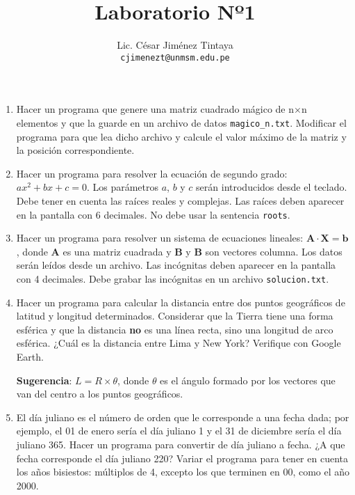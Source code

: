 \documentclass[a4paper,11pt,twoside,final]{article}
\begin{document}
    \title{Laboratorio Nº1}
    \author{Lic. César Jiménez Tintaya\\ \small{\texttt{cjimenezt@unmsm.edu.pe}}}
    \date{}
    \maketitle

    \begin{enumerate}
        \item Hacer un programa que genere una matriz cuadrado mágico de n×n elementos
        y que la guarde en un archivo de datos \texttt{magico\_n.txt}. Modificar el
        programa para que lea dicho archivo y calcule el valor máximo de la matriz
        y la posición correspondiente.

        \item Hacer un programa para resolver la ecuación de segundo grado:
        $ax^2+bx+c=0$. Los parámetros $a$, $b$ y $c$ serán introducidos desde
        el teclado. Debe tener en cuenta las raíces reales y complejas. Las
        raíces deben aparecer en la pantalla con 6 decimales. No debe usar la
        sentencia \texttt{roots}.

        \item Hacer un programa para resolver un sistema de ecuaciones
        lineales: $\mathbf{A}\cdot\mathbf{X}=\mathbf{b}$, donde $\mathbf{A}$ es
        una matriz cuadrada y $\mathbf{B}$ y $\mathbf{B}$ son vectores columna.
        Los datos serán leídos desde un archivo. Las incógnitas deben aparecer
        en la pantalla con 4 decimales. Debe grabar las incógnitas en un
        archivo \texttt{solucion.txt}.

        \item Hacer un programa para calcular la distancia entre dos puntos
        geográficos de latitud y longitud determinados. Considerar que la
        Tierra tiene una forma esférica y que la distancia \textbf{no} es una
        línea recta, sino una longitud de arco esférica. ¿Cuál es la distancia
        entre Lima y New York? Verifique con Google Earth.

        \textbf{Sugerencia}: $L=R\times\theta$, donde $\theta$ es el ángulo
        formado por los vectores que van del centro a los puntos geográficos.

        \item El día juliano es el número de orden que le corresponde a una
        fecha dada; por ejemplo, el 01 de enero sería el día juliano 1 y el 31
        de diciembre sería el día juliano 365. Hacer un programa para
        convertir de día juliano a fecha. ¿A que fecha corresponde el día
        juliano 220? Variar el programa para tener en cuenta los años
        bisiestos: múltiplos de 4, excepto los que terminen en 00, como el
        año 2000.


\end{enumerate}
\end{document}
